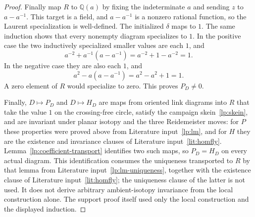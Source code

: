 \begin{proof}
Finally map $R$ to $\mathbb Q(a)$ by fixing the indeterminate $a$ and
sending $z$ to $a-a^{-1}$. This target is a field, and $a-a^{-1}$ is a
nonzero rational function, so the Laurent specialization is well-defined.
The initialized $\delta$ maps to $1$. The same induction shows that
every nonempty diagram specializes to $1$. In the positive case the two
inductively specialized smaller values are each $1$, and
\begin{equation}\label{lp:nonzero-positive}
 a^{-2}+a^{-1}(a-a^{-1})
       =a^{-2}+1-a^{-2}=1.
\end{equation}
In the negative case they are also each $1$, and
\begin{equation}\label{lp:nonzero-negative}
 a^2-a(a-a^{-1})=a^2-a^2+1=1.
\end{equation}
A zero element of $R$ would specialize to zero. This proves $P_D\ne0$.

Finally, $D\mapsto P_D$ and $D\mapsto H_D$ are maps from oriented link
diagrams into $R$ that take the value $1$ on the crossing-free circle,
satisfy the campaign skein~\eqref{lp:skein}, and are invariant under
planar isotopy and the three Reidemeister moves: for $P$ these properties
were proved above from Literature input~\ref{lp:lm}, and for $H$ they are
the existence and invariance clauses of Literature input~\ref{lit:homfly}.
Lemma~\ref{lp:coefficient-transport} identifies two such maps, so
$P_D=H_D$ on every actual diagram. This identification consumes the
uniqueness transported to $R$ by that lemma from Literature
input~\ref{lp:lm-uniqueness}, together with the existence clause of
Literature input~\ref{lit:homfly}; the uniqueness clause of the latter is
not used. It does not derive arbitrary ambient-isotopy invariance from the
local construction alone. The support proof itself used only the local
construction and the displayed induction.
\end{proof}

